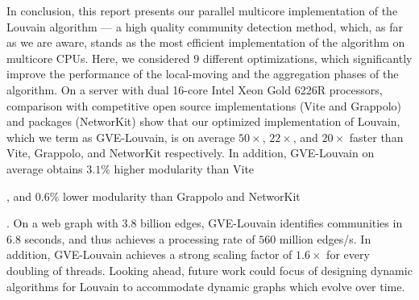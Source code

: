 In conclusion, this report presents our parallel multicore implementation of the Louvain algorithm --- a high quality community detection method, which, as far as we are aware, stands as the most efficient implementation of the algorithm on multicore CPUs. Here, we considered $9$ different optimizations, which significantly improve the performance of the local-moving and the aggregation phases of the algorithm. On a server with dual 16-core Intel Xeon Gold 6226R processors, comparison with competitive open source implementations (Vite and Grappolo) and packages (NetworKit) show that our optimized implementation of Louvain, which we term as GVE-Louvain, is on average $50\times$, $22\times$, and $20\times$ faster than Vite, Grappolo, and NetworKit respectively. In addition, GVE-Louvain on average obtains $3.1\%$ higher modularity than Vite, and $0.6\%$ lower modularity than Grappolo and NetworKit. On a web graph with $3.8$ billion edges, GVE-Louvain identifies communities in $6.8$ seconds, and thus achieves a processing rate of $560$ million edges/s. In addition, GVE-Louvain achieves a strong scaling factor of $1.6\times$ for every doubling of threads. Looking ahead, future work could focus of designing dynamic algorithms for Louvain to accommodate dynamic graphs which evolve over time.
